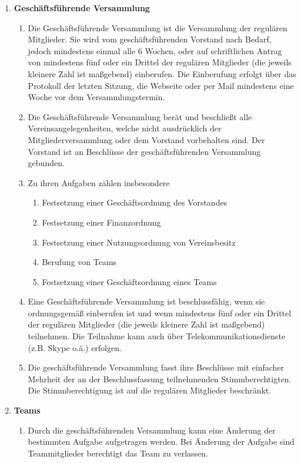 \documentclass[german]{article}
\newcommand{\paragr}[1]{\item \textsf{\textbf{#1}}}
\begin{document}
\begin{enumerate}
\begin{enumerate}
\end{enumerate}

\paragr{Geschäftsführende Versammlung}
\begin{enumerate}
\item Die Geschäftsführende Versammlung ist die Versammlung der regulären Mitglieder. Sie wird vom geschäftsführenden Vorstand nach Bedarf, jedoch mindestens einmal alle 6 Wochen, oder auf schriftlichen Antrag von mindestens fünf oder ein Drittel der regulären Mitglieder (die jeweils kleinere Zahl ist maßgebend) einberufen. Die Einberufung erfolgt über das Protokoll der letzten Sitzung, die Webseite oder per Mail mindestens eine Woche vor dem Versammlungstermin.
\item Die Geschäftsführende Versammlung berät und beschließt alle Vereinsangelegenheiten, welche nicht ausdrücklich der Mitgliederversammlung oder dem Vorstand vorbehalten sind. Der Vorstand ist an Beschlüsse der geschäftsführenden Versammlung gebunden.
\item Zu ihren Aufgaben zählen insbesondere
\begin{enumerate}
\item Festsetzung einer Geschäftsordnung des Vorstandes
\item Festsetzung einer Finanzordnung
\item Festsetzung einer Nutzungsordnung von Vereinsbesitz
\item Berufung von Teams
\item Festsetzung einer Geschäftsordnung eines Teams
\end{enumerate}
\item Eine Geschäftsführende Versammlung ist beschlussfähig, wenn sie ordnungsgemäß einberufen ist und wenn mindestens fünf oder ein Drittel der regulären Mitglieder (die jeweils kleinere Zahl ist maßgebend) teilnehmen. Die Teilnahme kann auch über Telekommunikationsdienste (z.B. Skype o.ä.) erfolgen.
\item Die geschäftsführende Versammlung fasst ihre Beschlüsse mit einfacher Mehrheit der an der Beschlussfassung teilnehmenden Stimmberechtigten. Die Stimmberechtigung ist auf die regulären Mitglieder beschränkt.
\end{enumerate}


\paragr{Teams}
\begin{enumerate}

\item Durch die geschäftsführenden Versammlung kann eine Änderung der bestimmten Aufgabe aufgetragen werden. Bei Änderung der Aufgabe sind Teammitglieder berechtigt das Team zu verlassen.


\end{enumerate}
\end{enumerate}
\end{document}
